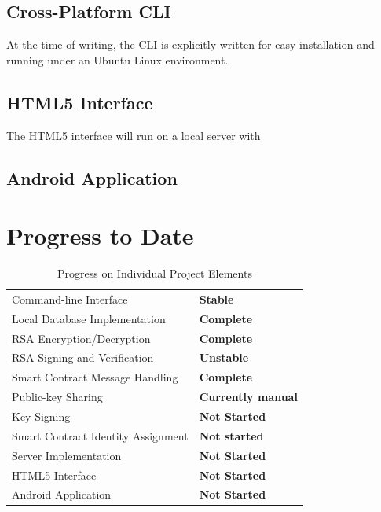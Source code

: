 \documentclass[titlepage]{report}
\begin{document}
\subsection{Cross-Platform CLI}
At the time of writing, the CLI is explicitly written for easy installation and running under an Ubuntu Linux environment.

\subsection{HTML5 Interface}
The HTML5 interface will run on a local server with

\subsection{Android Application}

\pagebreak

\section{Progress to Date}

\begin{table}[ht]
\begin{center}
\caption{Progress on Individual Project Elements}
\begin{tabular}{ | l | p{5cm} |}
\hline
Command-line Interface & \textbf{Stable} \\
Local Database Implementation & \textbf{Complete} \\
RSA Encryption/Decryption & \textbf{Complete} \\
RSA Signing and Verification & \textbf{Unstable} \\
Smart Contract Message Handling & \textbf{Complete} \\
\hline
Public-key Sharing & \textbf{Currently manual} \\
Key Signing & \textbf{Not Started} \\
\hline
Smart Contract Identity Assignment & \textbf{Not started} \\
Server Implementation & \textbf{Not Started} \\
HTML5 Interface & \textbf{Not Started} \\
Android Application & \textbf{Not Started} \\
\hline
\end{tabular}
\end{center}
\end{table}

\listoftables
\listoffigures
\printindex
\printglossaries{}
\printbibliography{}
\end{document}
